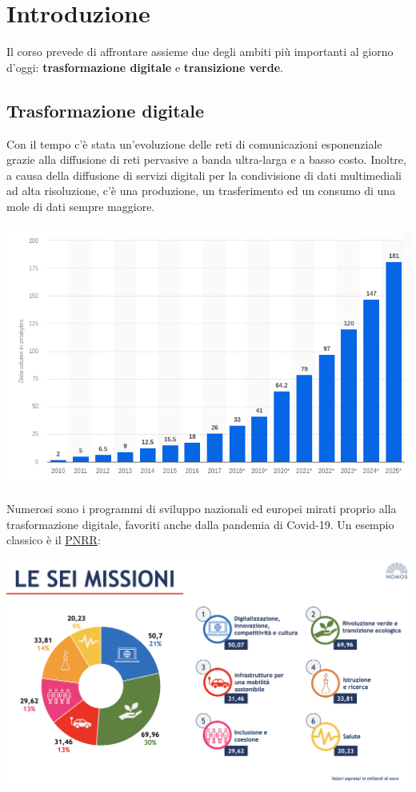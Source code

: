 \newpage
\section{Introduzione}
Il corso prevede di affrontare assieme due degli ambiti più importanti al giorno d'oggi: \textbf{trasformazione digitale} e \textbf{transizione verde}.
\subsection{Trasformazione digitale}
Con il tempo c'è stata un'evoluzione delle reti di comunicazioni esponenziale grazie alla diffusione di reti pervasive a banda ultra-larga e a basso costo. Inoltre, a causa della diffusione di servizi digitali per la condivisione di dati multimediali ad alta risoluzione, c'è una produzione, un trasferimento ed un consumo di una mole di dati sempre maggiore.
\begin{center}
	\includegraphics[scale=0.5]{data_creation.png}
\end{center}
Numerosi sono i programmi di sviluppo nazionali ed europei mirati proprio alla trasformazione digitale, favoriti anche dalla pandemia di Covid-19. Un esempio classico è il \href{https://www.mimit.gov.it/it/pnrr/piano}{PNRR}:
\begin{center}
	\includegraphics[scale=0.2]{missioni-pnrr.png}
\end{center}

